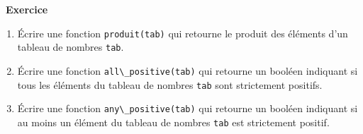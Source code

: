 \documentclass[
  11pt,
]{article}
\newcommand{\passthrough}[1]{#1}
\providecommand{\tightlist}{%
  \setlength{\itemsep}{0pt}\setlength{\parskip}{0pt}}
\newcounter{exo}
\newenvironment{exercice}[1]
{\par \medskip   \addtocounter{exo}{1} \noindent  
\begin{bclogo}[arrondi =0.1,   noborder = true, logo=\bccrayon, marge=4]{~\textbf{Exercice} \textbf{\theexo} {\itshape #1} }  \par}
{
\end{bclogo}
 \par \bigskip }
\newcounter{def}
\begin{document}
\begin{exercice}{}

\begin{enumerate}
\def\labelenumi{\arabic{enumi}.}
\tightlist
\item
  Écrire une fonction \passthrough{\lstinline!produit(tab)!} qui
  retourne le produit des éléments d'un tableau de nombres
  \passthrough{\lstinline!tab!}.
\item
  Écrire une fonction \passthrough{\lstinline!all\_positive(tab)!} qui
  retourne un booléen indiquant si tous les éléments du tableau de
  nombres \passthrough{\lstinline!tab!} sont strictement positifs.
\item
  Écrire une fonction \passthrough{\lstinline!any\_positive(tab)!} qui
  retourne un booléen indiquant si au moins un élément du tableau de
  nombres \passthrough{\lstinline!tab!} est strictement positif.
\end{enumerate}

\end{exercice}
\end{document}
